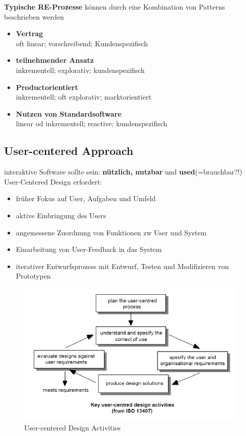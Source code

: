 \textbf{Typische RE-Prozesse} können durch eine Kombination von Patterns beschrieben werden
\begin{itemize}
	\item \textbf{Vertrag}\\
	oft linear; vorschreibend; Kundenspezifisch
	
	\item \textbf{teilnehmender Ansatz}\\
	inkrementell; explorativ; kundenspezifisch
	
	\item \textbf{Productorientiert}\\
	inkrementell; oft explorativ; marktorientiert
	
	\item \textbf{Nutzen von Standardsoftware}\\
	linear od inkrementell; reactive; kundenspezifisch
\end{itemize}

\subsection{User-centered Approach}
interaktive Software sollte sein: \textbf{nützlich, nutzbar} und \textbf{used}(=brauchbar?!)\\
User-Centered Design erfordert:
\begin{itemize}
	\item früher Fokus auf User, Aufgaben und Umfeld
	\item aktive Einbringung des Users
	\item angemessene Zuordnung von Funktionen zw User und System
	\item Einarbeitung von User-Feedback in das System
	\item iterativer Entwurfsprozess mit Entwurf, Testen und Modifizieren von Prototypen
\end{itemize}

\begin{figure}[!h]
	\centering
	\includegraphics[scale=0.7]{img/user_centered_activities.png}
	\caption{User-centered Design Activities}
\end{figure}


